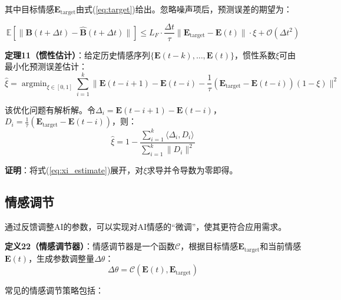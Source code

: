\documentclass[12pt,a4paper]{article}
\theoremstyle{plain}
\newcommand{\ve}[1]{\bm{#1}}                    %
\newcommand{\Evec}{\ve{E}}                        %
\newcommand{\Bvec}{\ve{B}}                        %
\DeclareMathOperator*{\argmin}{argmin}
\begin{document}
其中目标情感$\Evec_{\text{target}}$由式(\ref{eq:target})给出。忽略噪声项后，预测误差的期望为：

\begin{equation}
\mathbb{E}[\| \Bvec(t+\Delta t) - \hat{\Bvec}(t+\Delta t) \|] \leq L_F \cdot \frac{\Delta t}{\tau} \| \Evec_{\text{target}} - \Evec(t) \| \cdot \xi + \mathcal{O}(\Delta t^2)
\label{eq:prediction_error}
\end{equation}

\textbf{定理11（惯性估计）}：给定历史情感序列$\{\Evec(t-k), \dots, \Evec(t)\}$，惯性系数$\xi$可由最小化预测误差估计：
\begin{equation}
\hat{\xi} = \argmin_{\xi \in [0,1]} \sum_{i=1}^{k} \| \Evec(t-i+1) - \Evec(t-i) - \frac{1}{\tau}(\Evec_{\text{target}} - \Evec(t-i))(1-\xi) \|^2
\label{eq:xi_estimate}
\end{equation}

该优化问题有解析解。令$\Delta_i = \Evec(t-i+1) - \Evec(t-i)$，$D_i = \frac{1}{\tau}(\Evec_{\text{target}} - \Evec(t-i))$，则：
\begin{equation}
\hat{\xi} = 1 - \frac{\sum_{i=1}^k \langle \Delta_i, D_i \rangle}{\sum_{i=1}^k \|D_i\|^2}
\label{eq:xi_solution}
\end{equation}

\textbf{证明}：将式(\ref{eq:xi_estimate})展开，对$\xi$求导并令导数为零即得。

\subsection{情感调节}

通过反馈调整AI的参数，可以实现对AI情感的“微调”，使其更符合应用需求。

\textbf{定义22（情感调节器）}：情感调节器是一个函数$\mathcal{C}$，根据目标情感$\Evec_{\text{target}}$和当前情感$\Evec(t)$，生成参数调整量$\Delta \theta$：
\begin{equation}
\Delta \theta = \mathcal{C}(\Evec(t), \Evec_{\text{target}})
\label{eq:regulator}
\end{equation}

常见的情感调节策略包括：
\end{document}
